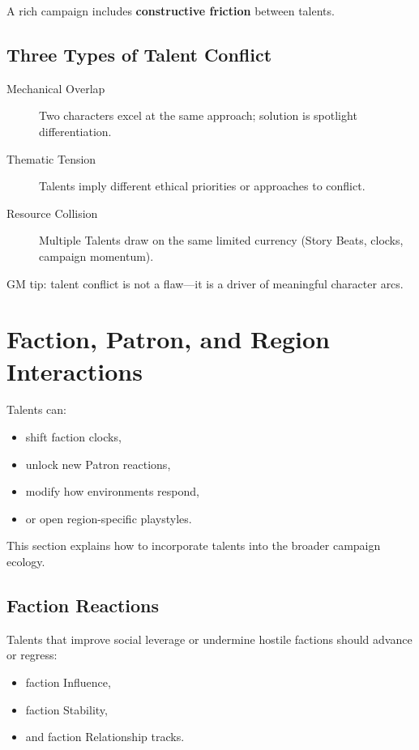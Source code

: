 \documentclass[11pt]{book}
\begin{document}
A rich campaign includes \textbf{constructive friction} between talents.

\subsection{Three Types of Talent Conflict}

\begin{description}
    \item[Mechanical Overlap]  
    Two characters excel at the same approach; solution is spotlight differentiation.

    \item[Thematic Tension]  
    Talents imply different ethical priorities or approaches to conflict.

    \item[Resource Collision]  
    Multiple Talents draw on the same limited currency (Story Beats, clocks, campaign momentum).
\end{description}

GM tip: talent conflict is not a flaw---it is a driver of meaningful character arcs.

\section{Faction, Patron, and Region Interactions}

Talents can:
\begin{itemize}
    \item shift faction clocks,  
    \item unlock new Patron reactions,  
    \item modify how environments respond,  
    \item or open region-specific playstyles.
\end{itemize}

This section explains how to incorporate talents into the broader campaign ecology.

\subsection{Faction Reactions}
Talents that improve social leverage or undermine hostile factions should advance or regress:
\begin{itemize}
    \item faction Influence,  
    \item faction Stability,  
    \item and faction Relationship tracks.
\end{itemize}
\end{document}

